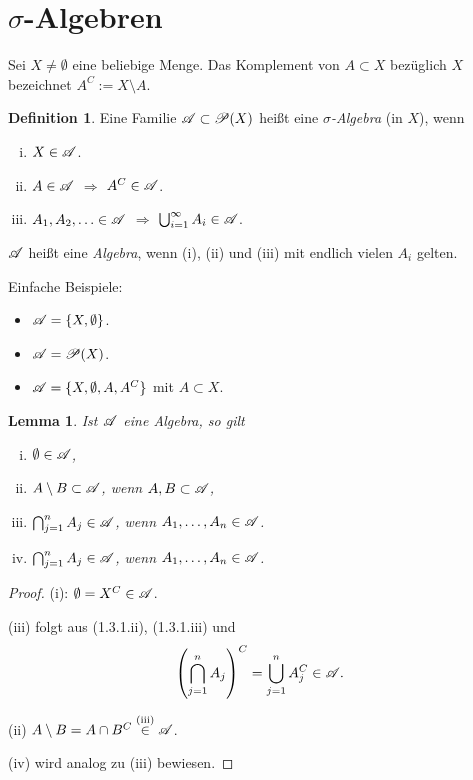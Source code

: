 \documentclass[
 a4paper,
 12pt,
 parskip=half
 ]{scrreprt}
\theoremstyle{plain}
\newtheorem{lem}[thm]{Lemma}
\theoremstyle{definition}
\newtheorem{defn}[thm]{Definition} %
\numberwithin{equation}{section}
\begin{document}
\section{\texorpdfstring{$\sigma$}{Sigma}-Algebren}
Sei $X \ne \emptyset$ eine beliebige Menge. Das Komplement von $A \subset X$ bezüglich $X$ bezeichnet $A^C := X \setminus A$.

\begin{defn}
 Eine Familie $\mathscr{A} \subset \mathscr{P}(X)$ heißt eine \emph{$\sigma$-Algebra} (in $X$), wenn
 \begin{enumerate}[(i)]
  \item $X \in \mathscr{A}$.
  \item $A \in \mathscr{A}$ $\Rightarrow$ $A^C \in \mathscr{A}$.
  \item $A_1, A_2, \ldots \in \mathscr{A}$ $\Rightarrow$ $\bigcup_{i=1}^\infty A_i \in \mathscr{A}$.
 \end{enumerate}
 $\mathscr{A}$ heißt eine \emph{Algebra}, wenn (i), (ii) und (iii) mit endlich vielen $A_i$ gelten.
\end{defn}

Einfache Beispiele:
\begin{itemize}
 \item $\mathscr{A} = \{ X, \emptyset \}$.
 \item $\mathscr{A} = \mathscr{P}( X )$.
 \item $\mathscr{A} = \{ X, \emptyset, A, A^C \}$ mit $A \subset X$.
\end{itemize}

\begin{lem}
 Ist $\mathscr{A}$ eine Algebra, so gilt
 \begin{enumerate}[(i)]
  \item $\emptyset \in \mathscr{A}$,
  \item $A \setminus B \subset \mathscr{A}$, wenn $A,B \subset \mathscr{A}$,
  \item $\bigcap_{j=1}^n A_j \in \mathscr{A}$, wenn $A_1, \ldots, A_n \in \mathscr{A}$.
  \item $\bigcap_{j=1}^n A_j \in \mathscr{A}$, wenn $A_1, \ldots, A_n \in \mathscr{A}$.
 \end{enumerate}
\end{lem}

\begin{proof}
 (i): $\emptyset = X^C \in \mathscr{A}$.
  
 (iii) folgt aus (1.3.1.ii), (1.3.1.iii) und 
 \[ \left( \bigcap_{j=1}^n A_j \right)^C = \bigcup_{j=1}^n A_j^C \in \mathscr{A}. \]
 
 (ii) $A \setminus B = A \cap B^C \overset{\text{(iii)}}\in \mathscr{A}$.
 
 (iv) wird analog zu (iii) bewiesen.
\end{proof}
\end{document}

